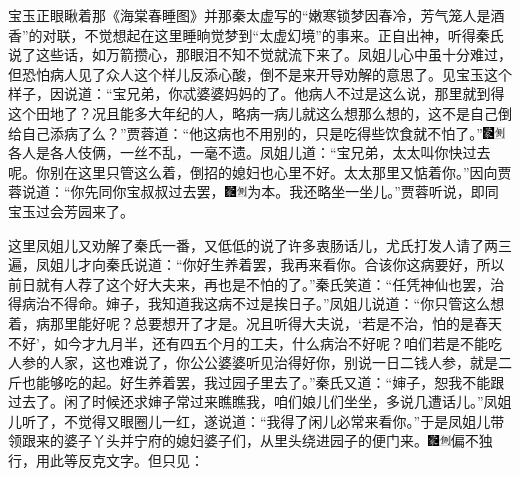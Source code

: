 宝玉正眼瞅着那《海棠春睡图》并那秦太虚写的``嫩寒锁梦因春冷，芳气笼人是酒香''的对联，不觉想起在这里睡晌觉梦到``太虚幻境''的事来。正自出神，听得秦氏说了这些话，如万箭攒心，那眼泪不知不觉就流下来了。凤姐儿心中虽十分难过，但恐怕病人见了众人这个样儿反添心酸，倒不是来开导劝解的意思了。见宝玉这个样子，因说道：``宝兄弟，你忒婆婆妈妈的了。他病人不过是这么说，那里就到得这个田地了？况且能多大年纪的人，略病一病儿就这么想那么想的，这不是自己倒给自己添病了么？''贾蓉道：``他这病也不用别的，只是吃得些饮食就不怕了。''{\includegraphics[width=3mm]{../Images/00006}\includegraphics[width=3mm]{../Images/00011}\footnotesize \kaishu 各人是各人伎俩，一丝不乱，一毫不遗。}凤姐儿道：``宝兄弟，太太叫你快过去呢。你别在这里只管这么着，倒招的媳妇也心里不好。太太那里又惦着你。''因向贾蓉说道：``你先同你宝叔叔过去罢，{\includegraphics[width=3mm]{../Images/00006}\includegraphics[width=3mm]{../Images/00011}\footnotesize \kaishu 为本。}我还略坐一坐儿。''贾蓉听说，即同宝玉过会芳园来了。

这里凤姐儿又劝解了秦氏一番，又低低的说了许多衷肠话儿，尤氏打发人请了两三遍，凤姐儿才向秦氏说道：``你好生养着罢，我再来看你。合该你这病要好，所以前日就有人荐了这个好大夫来，再也是不怕的了。''秦氏笑道：``任凭神仙也罢，治得病治不得命。婶子，我知道我这病不过是挨日子。''凤姐儿说道：``你只管这么想着，病那里能好呢？总要想开了才是。况且听得大夫说，`若是不治，怕的是春天不好'，如今才九月半，还有四五个月的工夫，什么病治不好呢？咱们若是不能吃人参的人家，这也难说了，你公公婆婆听见治得好你，别说一日二钱人参，就是二斤也能够吃的起。好生养着罢，我过园子里去了。''秦氏又道：``婶子，恕我不能跟过去了。闲了时候还求婶子常过来瞧瞧我，咱们娘儿们坐坐，多说几遭话儿。''凤姐儿听了，不觉得又眼圈儿一红，遂说道：``我得了闲儿必常来看你。''于是凤姐儿带领跟来的婆子丫头并宁府的媳妇婆子们，从里头绕进园子的便门来。{\includegraphics[width=3mm]{../Images/00006}\includegraphics[width=3mm]{../Images/00011}\footnotesize \kaishu 偏不独行，用此等反克文字。}但只见：

